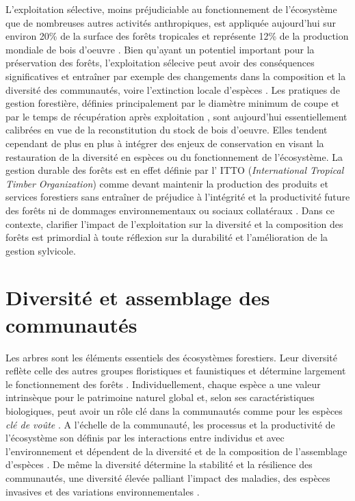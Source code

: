 \documentclass[
  11pt,
  french,
  A4paper,
  extrafontsizes,onecolumn,openright
  ]{memoir}
\begin{document}
L'exploitation sélective, moins préjudiciable au fonctionnement de
l'écosystème que de nombreuses autres activités anthropiques, est
appliquée aujourd'hui sur environ 20\% de la surface des forêts
tropicales et représente 12\% de la production mondiale de bois d'oeuvre
\autocite{Martin2015}. Bien qu'ayant un potentiel important pour la
préservation des forêts, l'exploitation sélecive peut avoir des
conséquences significatives et entraîner par exemple des changements
dans la composition et la diversité des communautés, voire l'extinction
locale d'espèces \autocite{Gibson2011}. Les pratiques de gestion
forestière, définies principalement par le diamètre minimum de coupe et
par le temps de récupération après exploitation \autocite{Sist2015},
sont aujourd'hui essentiellement calibrées en vue de la reconstitution
du stock de bois d'oeuvre. Elles tendent cependant de plus en plus à
intégrer des enjeux de conservation en visant la restauration de la
diversité en espèces ou du fonctionnement de l'écosystème. La gestion
durable des forêts est en effet définie par l' ITTO (\emph{International
Tropical Timber Organization}) comme devant maintenir la production des
produits et services forestiers sans entraîner de préjudice à
l'intégrité et la productivité future des forêts ni de dommages
environnementaux ou sociaux collatéraux \autocite{ITTO2005}. Dans ce
contexte, clarifier l'impact de l'exploitation sur la diversité et la
composition des forêts est primordial à toute réflexion sur la
durabilité et l'amélioration de la gestion sylvicole.

\section{Diversité et assemblage des
communautés}\label{diversite-et-assemblage-des-communautes}

Les arbres sont les éléments essentiels des écosystèmes forestiers. Leur
diversité reflète celle des autres groupes floristiques et faunistiques
et détermine largement le fonctionnement des forêts
\autocite{Guitet2017}. Individuellement, chaque espèce a une valeur
intrinsèque pour le patrimoine naturel global et, selon ses
caractéristiques biologiques, peut avoir un rôle clé dans la communautés
comme pour les espèces \emph{clé de voûte}
\autocites{Jones1994}{Power1996}{Gardner2007}. A l'échelle de la
communauté, les processus et la productivité de l'écosystème son définis
par les interactions entre individus et avec l'environnement et
dépendent de la diversité et de la composition de l'assemblage d'espèces
\autocite{Begon2006}. De même la diversité détermine la stabilité et la
résilience des communautés, une diversité élevée palliant l'impact des
maladies, des espèces invasives et des variations environnementales
\autocite{Elmqvist2003}.
\end{document}
